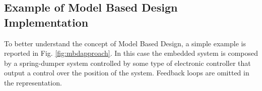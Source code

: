 \documentclass[../main.tex]{subfiles}
\begin{document}
\subsection{Example of Model Based Design Implementation}
To better understand the concept of Model Based Design, a simple example is reported in Fig. \ref{fig:mbdapproach}. In this case the embedded system is composed by a spring-dumper system controlled by some type of electronic controller that output a control over the position of the system. Feedback loops are omitted in the representation.
\begin{figure}[h]
    \centering
    \begin{tikzpicture}[x=0.75pt,y=0.75pt,yscale=-1,xscale=1]


\end{tikzpicture}
\end{figure}
\end{document}
